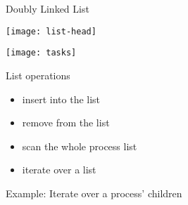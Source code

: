 \begin{frame}{Doubly Linked List}
  \begin{center}
  \end{center}
  \begin{varwidth}{.5\textwidth}
    \begin{center}
      \texttt{[image: list-head]}
    \end{center}
  \end{varwidth}\hfill
  \begin{varwidth}{.35\textwidth}
    \begin{center}
      \texttt{[image: tasks]}
    \end{center}
  \end{varwidth}
\end{frame}

\begin{frame}
  \begin{block}{List operations}
    \begin{itemize}
    \item[] insert into the list
    \item[] remove from the list
    \item[] scan the whole process list
      \begin{center}
         
      \end{center}
    \item[] iterate over a list
      \begin{center}
      \end{center}
    \end{itemize}
  \end{block}
  \begin{block}{Example: Iterate over a process' children}
    \begin{center}
    \end{center}
  \end{block}
\end{frame}

